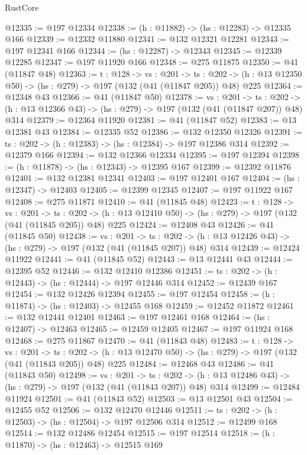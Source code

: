 \begin{lexlean}{RustCore}
\begin{coremodule}
@12335 := @197 @12334
@12338 := (h : @11882) -> (hs : @12283) -> @12335 @166
@12339 := @12332 @11880
@12341 := @132 @12321 @12281
@12343 := @197 @12341 @166
@12344 := (hs : @12287) -> @12343
@12345 := @12339 @12285
@12347 := @197 @11920 @166
@12348 := @275 @11875
@12350 := @41 (@11847 @48)
@12363 := {t : @128} ->
  {vs : @201} ->
  {ts : @202} -> (h : @13 @12350 @50) -> (hs : @279) -> @197 (@132 (@41 (@11847 @205)) @48) @225
@12364 := @12348 @43
@12366 := @41 (@11847 @50)
@12378 := {vs : @201} ->
  {ts : @202} -> (h : @13 @12366 @43) -> (hs : @279) -> @197 (@132 (@41 (@11847 @207)) @48) @314
@12379 := @12364 @11920
@12381 := @41 (@11847 @52)
@12383 := @13 @12381 @43
@12384 := @12335 @52
@12386 := @132 @12350 @12326
@12391 := {ts : @202} -> (h : @12383) -> (hs : @12384) -> @197 @12386 @314
@12392 := @12379 @166
@12394 := @132 @12366 @12334
@12395 := @197 @12394
@12398 := (h : @11878) -> (hs : @12343) -> @12395 @167
@12399 := @12392 @11876
@12401 := @132 @12381 @12341
@12403 := @197 @12401 @167
@12404 := (hs : @12347) -> @12403
@12405 := @12399 @12345
@12407 := @197 @11922 @167
@12408 := @275 @11871
@12410 := @41 (@11845 @48)
@12423 := {t : @128} ->
  {vs : @201} ->
  {ts : @202} -> (h : @13 @12410 @50) -> (hs : @279) -> @197 (@132 (@41 (@11845 @205)) @48) @225
@12424 := @12408 @43
@12426 := @41 (@11845 @50)
@12438 := {vs : @201} ->
  {ts : @202} -> (h : @13 @12426 @43) -> (hs : @279) -> @197 (@132 (@41 (@11845 @207)) @48) @314
@12439 := @12424 @11922
@12441 := @41 (@11845 @52)
@12443 := @13 @12441 @43
@12444 := @12395 @52
@12446 := @132 @12410 @12386
@12451 := {ts : @202} -> (h : @12443) -> (hs : @12444) -> @197 @12446 @314
@12452 := @12439 @167
@12454 := @132 @12426 @12394
@12455 := @197 @12454
@12458 := (h : @11874) -> (hs : @12403) -> @12455 @168
@12459 := @12452 @11872
@12461 := @132 @12441 @12401
@12463 := @197 @12461 @168
@12464 := (hs : @12407) -> @12463
@12465 := @12459 @12405
@12467 := @197 @11924 @168
@12468 := @275 @11867
@12470 := @41 (@11843 @48)
@12483 := {t : @128} ->
  {vs : @201} ->
  {ts : @202} -> (h : @13 @12470 @50) -> (hs : @279) -> @197 (@132 (@41 (@11843 @205)) @48) @225
@12484 := @12468 @43
@12486 := @41 (@11843 @50)
@12498 := {vs : @201} ->
  {ts : @202} -> (h : @13 @12486 @43) -> (hs : @279) -> @197 (@132 (@41 (@11843 @207)) @48) @314
@12499 := @12484 @11924
@12501 := @41 (@11843 @52)
@12503 := @13 @12501 @43
@12504 := @12455 @52
@12506 := @132 @12470 @12446
@12511 := {ts : @202} -> (h : @12503) -> (hs : @12504) -> @197 @12506 @314
@12512 := @12499 @168
@12514 := @132 @12486 @12454
@12515 := @197 @12514
@12518 := (h : @11870) -> (hs : @12463) -> @12515 @169

\end{coremodule}
\end{lexlean}
